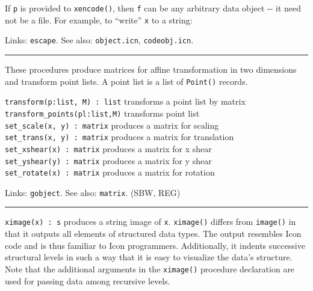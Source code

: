 If \texttt{p} is provided to \texttt{xencode()}, then \texttt{f} can be any
arbitrary data object -{}- it need not be a file. For example, to
``write'' \texttt{x} to a string:


Links: \texttt{escape}. See also: \texttt{object.icn},
\texttt{codeobj.icn}.

\vspace{0.25cm}\hrule{}

These procedures produce matrices for affine transformation in two
dimensions and transform point lists. A point list is a list of
\texttt{Point()} records.

\texttt{transform(p:list, M) : list} transforms a point list by
matrix\\
\texttt{transform\_points(pl:list,M)} transforms point list\\
\texttt{set\_scale(x, y) : matrix} produces a matrix for scaling\\
\texttt{set\_trans(x, y) : matrix} produces a matrix for
translation\\
\texttt{set\_xshear(x) : matrix} produces a matrix for x shear\\
\texttt{set\_yshear(y) : matrix} produces a matrix for y shear\\
\texttt{set\_rotate(x) : matrix} produces a matrix for rotation

Links: \texttt{gobject}. See also: \texttt{matrix}. (SBW, REG)

\vspace{0.25cm}\hrule{}

\texttt{ximage(x) : s} produces a string image of \texttt{x}.
\texttt{ximage()} differs from \texttt{image()} in that it outputs all
elements of structured data types. The output
resembles Icon code and is thus familiar to Icon programmers.
Additionally, it indents successive structural levels in such a way
that it is easy to visualize the data's structure.
Note that the additional arguments in the \texttt{ximage()} procedure
declaration are used for passing data among recursive levels. 

